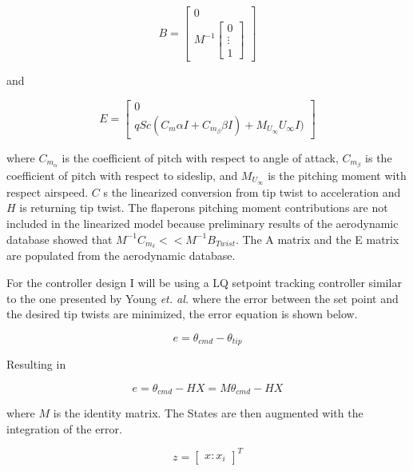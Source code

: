 \documentclass[11pt]{ucthesis}
\begin{document}
\begin{equation}
B = \begin{bmatrix}
0\\
M^{-1}\begin{bmatrix}
0\\\vdots\\1\end{bmatrix}
\end{bmatrix}
\end{equation}

and

\begin{equation}
E = \begin{bmatrix}
0\\
qSc(C_m\alpha I+C_{m_{\beta}}\beta I)+M_{U_{\infty}}U_{\infty}I)
\end{bmatrix}
\end{equation}

where $C_{m_{\alpha}}$ is the coefficient of pitch with respect to angle of attack, $C_{m_{\beta}}$ is the coefficient of pitch with respect to sideslip, and $M_{U_{\infty}}$ is the pitching moment with respect airspeed. $C$ s the linearized conversion from tip twist to acceleration and $H$ is returning tip twist. The flaperons pitching moment contributions are not included in the linearized model because preliminary results of the aerodynamic database showed that $M^{-1}C_{m_{\delta}}<<M^{-1}B_{Twist}$. The A matrix and the E matrix are populated from the aerodynamic database.

For the controller design I will be using a LQ setpoint tracking controller similar to the one presented by Young \textit{et. al.}\cite{young1972approach}  where the error between the set point and the desired tip twists are minimized, the error equation is shown below.

\begin{equation}
e = \theta_{cmd}-\theta_{tip}
\end{equation}

Resulting in

\begin{equation}
e = \theta_{cmd}-HX = M\theta_{cmd}-HX
\end{equation}

where $M$ is the identity matrix. The States are then augmented with the integration of the error.

\begin{equation}
z = \begin{bmatrix}
x:x_i\end{bmatrix}^T
\end{equation}
\end{document}
